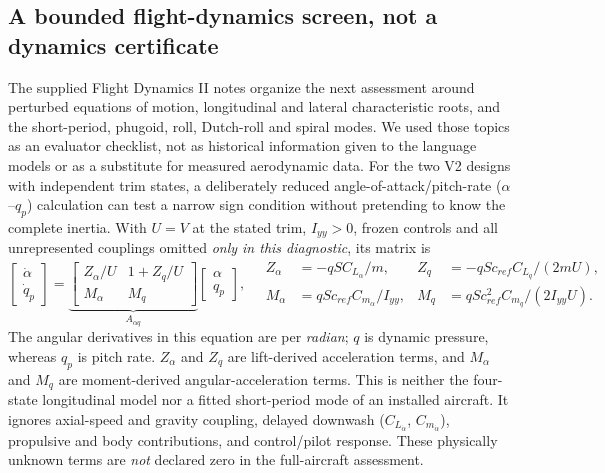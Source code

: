\documentclass[11pt,a4paper]{article}
\begin{document}
\subsection{A bounded flight-dynamics screen, not a dynamics certificate}
The supplied Flight Dynamics II notes organize the next assessment around perturbed equations of motion, longitudinal and lateral characteristic roots, and the short-period, phugoid, roll, Dutch-roll and spiral modes. We used those topics as an evaluator checklist, not as historical information given to the language models or as a substitute for measured aerodynamic data. For the two V2 designs with independent trim states, a deliberately reduced angle-of-attack/pitch-rate ($\alpha$--$q_p$) calculation can test a narrow sign condition without pretending to know the complete inertia. With $U=V$ at the stated trim, $I_{yy}>0$, frozen controls and all unrepresented couplings omitted \emph{only in this diagnostic}, its matrix is
\begin{equation}
\begin{bmatrix}\dot\alpha\\\dot q_p\end{bmatrix}
=\underbrace{\begin{bmatrix}Z_\alpha/U&1+Z_q/U\\M_\alpha&M_q\end{bmatrix}}_{A_{\alpha q}}
\begin{bmatrix}\alpha\\q_p\end{bmatrix},\quad
\begin{aligned}
Z_\alpha&=-qSC_{L_\alpha}/m,&Z_q&=-qSc_{ref}C_{L_q}/(2mU),\\
M_\alpha&=qSc_{ref}C_{m_\alpha}/I_{yy},&M_q&=qSc_{ref}^{2}C_{m_q}/(2I_{yy}U).
\end{aligned}
\label{eq:reduced_dynamic_screen}
\end{equation}
The angular derivatives in this equation are per \emph{radian}; $q$ is dynamic pressure, whereas $q_p$ is pitch rate. $Z_\alpha$ and $Z_q$ are lift-derived acceleration terms, and $M_\alpha$ and $M_q$ are moment-derived angular-acceleration terms. This is neither the four-state longitudinal model nor a fitted short-period mode of an installed aircraft. It ignores axial-speed and gravity coupling, delayed downwash ($C_{L_{\dot\alpha}}$, $C_{m_{\dot\alpha}}$), propulsive and body contributions, and control/pilot response. These physically unknown terms are \emph{not} declared zero in the full-aircraft assessment.
\end{document}
